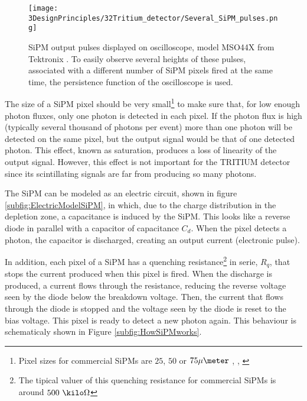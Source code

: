 \begin{figure}[h]
\centering
\texttt{[image: 3DesignPrinciples/32Tritium\_detector/Several\_SiPM\_pulses.png]}
\caption{SiPM output pulses displayed on oscilloscope, model MSO44X from Tektronix \cite{Oscilloscope}. To easily observe several heights of these pulses, associated with a different number of  SiPM pixels fired at the same time, the persistence function of the oscilloscope is used.\label{fig:PulsesOfSiPM}}
\end{figure}

The size of a SiPM pixel should be very small\footnote{Pixel sizes for commercial SiPMs are $25$, $50$ or $75\mu\meter$ \cite{DataSheetHammamatsu_1_SiPM_25}, \cite{DataSheetHammamatsu_1_SiPM_50}, \cite{DataSheetHammamatsu_1_SiPM_75}} to make sure that, for low enough photon fluxes, only one photon is detected in each pixel. If the photon flux is high (typically several thousand of photons per event) more than one photon will be detected on the same pixel, but the output signal would be that of one detected photon. This effect, known as saturation, produces a loss of linearity of the output signal. However, this effect is not important for the TRITIUM detector since its scintillating signals are far from producing so many photons. %

The SiPM can be modeled as an electric circuit, shown in figure \ref{subfig:ElectricModelSiPM}, in which, due to the charge distribution in the depletion zone, a capacitance is induced by the SiPM. This looks like a reverse diode in parallel with a capacitor of capacitance $C_d$. When the pixel detects a photon, the capacitor is discharged, creating an output current (electronic pulse).

In addition, each pixel of a SiPM has a quenching resistance\footnote{The tipical valuer of this quenching resistance for commercial SiPMs is around $500~\kilo\Omega$} in serie, $R_q$, that stops the current produced when this pixel is fired. When the discharge is produced, a current flows through the resistance, reducing the reverse voltage seen by the diode below the breakdown voltage. Then, the current that flows through the diode is stopped and the voltage seen by the diode is reset to the bias voltage. This pixel is ready to detect a new photon again. This behaviour is schematicaly shown in Figure \ref{subfig:HowSiPMworks}.

